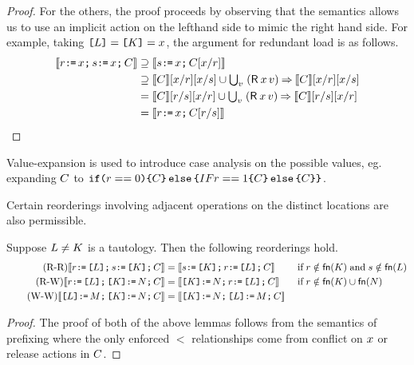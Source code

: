 \begin{lemma}
\begin{proof}
  For the others, the proof proceeds by observing that the semantics allows us
  to use an implicit action on the lefthand side to mimic the right hand side.
  For example, taking $\texttt{[}L\texttt{]}=\texttt{[}K\texttt{]}=x$, the argument for
  redundant load is as follows.
  \begin{align*}
    \sem{\aReg \GETS \aLoc \SEMI \bReg \GETS \aLoc  \SEMI \aCmd} 
    &\supseteq  \sem{ \bReg  \GETS \aLoc \SEMI \aCmd[\aLoc/\aReg]} \\
    &\supseteq  \sem{\aCmd}[\aLoc/\aReg][\aLoc/\bReg] \cup  \textstyle\bigcup_\aVal\;  (\DR\aLoc\aVal) \prefix \sem{\aCmd}[\aLoc/\aReg][\aLoc/\bReg]\\
    &= \sem{\aCmd}[\aReg/ \bReg][\aLoc/\aReg] \cup  \textstyle\bigcup_\aVal\;  (\DR\aLoc\aVal) \prefix \sem{\aCmd}[\aReg/ \bReg][\aLoc/\aReg]\\
    &= \sem{\aReg \GETS \aLoc\SEMI \aCmd[\aReg/\bReg]}
    \tag*{\qedhere}
  \end{align*}
\end{proof}
\end{lemma}
Value-expansion is used to introduce case analysis on the possible values, eg. expanding $C$ to 
$\texttt{if}\allowbreak\texttt{(}r ==0\texttt{)}\allowbreak\texttt{\{}C\texttt{\}}\,\allowbreak\texttt{else}\allowbreak\,\texttt{\{} IF{r ==1}\allowbreak\texttt{\{}C\texttt{\}}\,\allowbreak\texttt{else}\allowbreak\,\texttt{\{} C\texttt{\}}\texttt{\}}$.  
  
Certain reorderings involving adjacent operations on the distinct locations
are also permissible. 

\begin{lemma}%
  Suppose $L\neq K$ is a tautology.  Then the following reorderings hold.
  \begin{align*}
    \tag{R-R}
    \llbracket r \texttt{:}\mkern-1mu\texttt{=}\, \texttt{[}L\texttt{]} \texttt{;}\,\allowbreak s \texttt{:}\mkern-1mu\texttt{=}\, \texttt{[}K\texttt{]} \texttt{;}\,\allowbreak C\rrbracket &=
    \llbracket s \texttt{:}\mkern-1mu\texttt{=}\, \texttt{[}K\texttt{]} \texttt{;}\,\allowbreak r \texttt{:}\mkern-1mu\texttt{=}\, \texttt{[}L\texttt{]} \texttt{;}\,\allowbreak C\rrbracket
    &&\;\allowbreak\text{if}\allowbreak\; r\notin\mathsf{fn}(K) \;\allowbreak\text{and}\allowbreak\; s\notin\mathsf{fn}(L)
    \\
    \tag{R-W}
    \llbracket r \texttt{:}\mkern-1mu\texttt{=}\, \texttt{[}L\texttt{]} \texttt{;}\,\allowbreak \texttt{[}K\texttt{]} \texttt{:}\mkern-1mu\texttt{=}\, N \texttt{;}\,\allowbreak C\rrbracket &=
    \llbracket\texttt{[}K\texttt{]} \texttt{:}\mkern-1mu\texttt{=}\, N \texttt{;}\,\allowbreak r \texttt{:}\mkern-1mu\texttt{=}\, \texttt{[}L\texttt{]} \texttt{;}\,\allowbreak C\rrbracket
    &&\;\allowbreak\text{if}\allowbreak\; r\notin\mathsf{fn}(K) \cup\mathsf{fn}(N)
    \\
    \tag{W-W}
    \llbracket\texttt{[}L\texttt{]} \texttt{:}\mkern-1mu\texttt{=}\, M \texttt{;}\,\allowbreak \texttt{[}K\texttt{]} \texttt{:}\mkern-1mu\texttt{=}\, N \texttt{;}\,\allowbreak C\rrbracket &=
    \llbracket\texttt{[}K\texttt{]} \texttt{:}\mkern-1mu\texttt{=}\, N \texttt{;}\,\allowbreak \texttt{[}L\texttt{]} \texttt{:}\mkern-1mu\texttt{=}\, M \texttt{;}\,\allowbreak C\rrbracket
  \end{align*}
\begin{proof}
The proof of both of the above lemmas follows from the semantics of prefixing where the only enforced $\lt$ relationships come from conflict on $x$ or release actions in $C$.
\end{proof}
\end{lemma}

